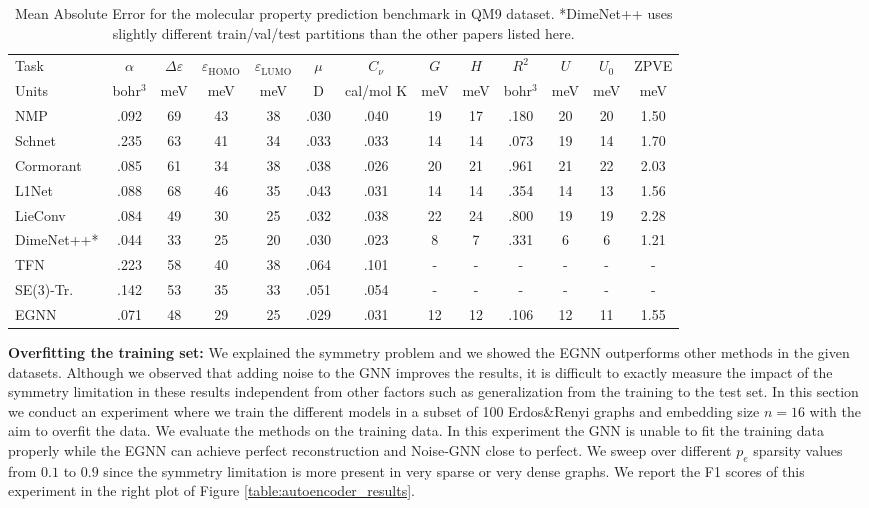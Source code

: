 \begin{table}[th]
  \centering
  \begin{tabular}{l c c c c c c c c c c c c}
  \toprule
    Task & $\alpha$ & $\Delta \varepsilon$ & $\varepsilon_{\mathrm{HOMO}}$ & $\varepsilon_{\mathrm{LUMO}}$ & $\mu$ & $C_{\nu}$ & $G$ & $H$ & $R^2$ & $U$ & $U_0$ & ZPVE \\
    Units & bohr$^3$ & meV & meV & meV & D & cal/mol K & meV & meV & bohr$^3$ & meV & meV & meV \\
    \midrule
    NMP & .092 & 69 & 43 & 38 & .030 & .040 & 19 & 17 & .180 & 20 & 20 & 1.50 \\
    Schnet & .235 & 63 & 41 & 34 & .033 & .033 & 14 & 14 & .073 & 19 & 14 & 1.70 \\
    Cormorant & .085 & 61 & 34 & 38 & .038 & .026 & 20 & 21 & .961 & 21 & 22 & 2.03  \\
    L1Net & .088 & 68 & 46 & 35 & .043 & .031 & 14 & 14 & .354 & 14 & 13 &  1.56\\
    
    LieConv & .084 & 49 & 30 & 25 & .032 & .038 & 22 & 24 & .800 & 19 & 19 & 2.28 \\
    DimeNet++* & .044 & 33 & 25 & 20 & .030 & .023 & 8 & 7 & .331 & 6 & 6 & 1.21  \\
    TFN & .223 & 58 & 40 & 38 & .064 & .101 & - & - & - & - & - & - \\
    SE(3)-Tr. & .142 & 53 & 35 & 33 & .051 & .054 & - & - & - & - & - & -  \\
    \midrule
    EGNN & .071  & 48 & 29 & 25 & .029 & .031 & 12 & 12 & .106 & 12 & 11 & 1.55  \\
    \bottomrule
  \end{tabular}
  \caption{Mean Absolute Error for the molecular property prediction benchmark in QM9 dataset. *DimeNet++ uses slightly different train/val/test partitions than the other papers listed here.}
  \label{tab:qm9}
\end{table}


\textbf{Overfitting the training set:} We explained the symmetry problem and we showed the EGNN outperforms other methods in the given datasets. Although we observed that adding noise to the GNN improves the results, it is difficult to exactly measure the impact of the symmetry limitation in these results independent from other factors such as generalization from the training to the test set. In this section we conduct an experiment where we train the different models in a subset of 100 Erdos\&Renyi graphs and embedding size $n=16$ with the aim to overfit the data. We evaluate the methods on the training data. In this experiment the GNN is unable to fit the training data properly while the EGNN can achieve perfect reconstruction and Noise-GNN close to perfect. We sweep over different $p_e$ sparsity values from $0.1$ to $0.9$ since the symmetry limitation is more present in very sparse or very dense graphs. We report the F1 scores of this experiment in the right plot of Figure \ref{table:autoencoder_results}.


